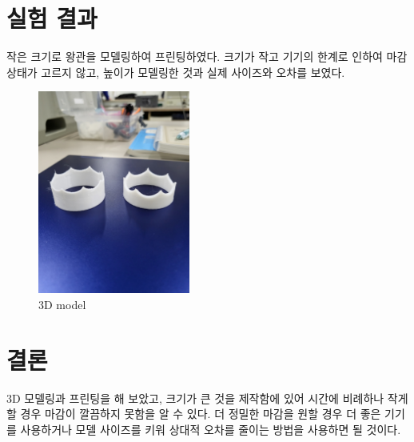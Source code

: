 \documentclass[a4paper, 10pt, nanum]{CSUniSchoolLabReport}
\begin{document}
\section{실험 결과}

	작은 크기로 왕관을 모델링하여 프린팅하였다. 크기가 작고 기기의 한계로 인하여 마감 상태가 고르지 않고, 높이가 모델링한 것과 실제 사이즈와 오차를 보였다.

	\begin{figure}[htb!]
		\centering
		\includegraphics[width=5cm]{fig9.jpg}
		\caption{3D model}
		\label{fig:9}
	\end{figure}



\section{결론}

	3D 모델링과 프린팅을 해 보았고, 크기가 큰 것을 제작함에 있어 시간에 비례하나 작게할 경우 마감이 깔끔하지 못함을 알 수 있다. 더 정밀한 마감을 원할 경우 더 좋은 기기를 사용하거나 모델 사이즈를 키워 상대적 오차를 줄이는 방법을 사용하면 될 것이다.



\end{document}
